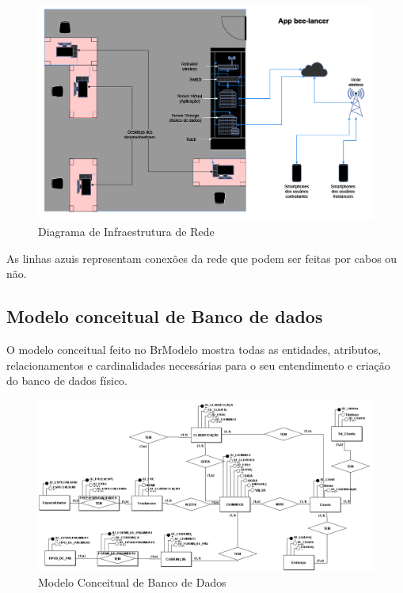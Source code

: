 \documentclass[
  a4paper,%
  12pt,%
  english,%
  brazilian,%
]{article}
\begin{document}
\begin{figure}[h]
\centering
\caption{Diagrama de Infraestrutura de Rede}%
\label{fig:diagrama-classe}
 \includegraphics[width=1\textwidth]{fotos/Diagrama de Infraestrutura de Rede PI.png}
\end{figure}

     As linhas azuis representam conexões da rede que podem ser feitas por cabos ou não.

\break

\subsection*{Modelo conceitual de Banco de dados}

    O modelo conceitual feito no BrModelo mostra todas as entidades, atributos, relacionamentos e cardinalidades necessárias para o seu entendimento e criação do banco de dados físico.

\begin{figure}[h]
\centering
\caption{Modelo Conceitual de Banco de Dados}%
\label{fig:diagrama-objetos}
 \includegraphics[width=1\textwidth]{fotos/modelo conceitual banco de dados.png}
\end{figure}
\end{document}
